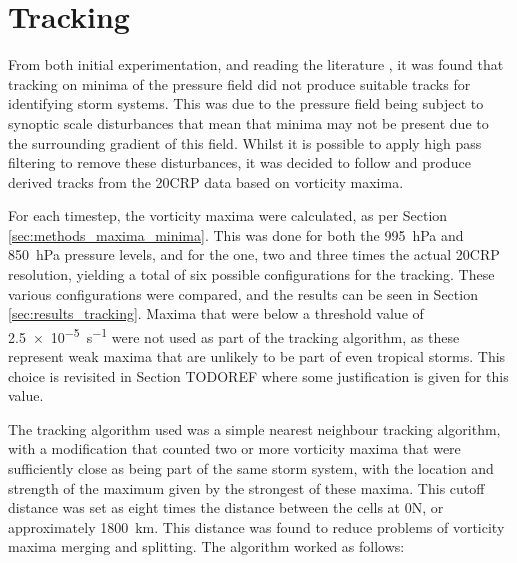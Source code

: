 \documentclass[pdftex,12pt,a4paper]{report}
\begin{document}
\section{Tracking}

From both initial experimentation, and reading the literature \parencite{TODOCITEmultiple}, it was found
that tracking on minima of the pressure field did not produce suitable tracks for identifying
storm systems. This was due to the pressure field being subject to synoptic scale disturbances
that mean that minima may not be present due to the surrounding gradient of this field. Whilst it is
possible to apply high pass filtering to remove these disturbances, it was decided to follow
\textcite{TODOCITEmultiple} and produce derived tracks from the 20CRP data based on vorticity maxima.

For each timestep, the vorticity maxima were calculated, as per Section
\ref{sec:methods_maxima_minima}. This was done for both the \SI{995}{hPa} and \SI{850}{hPa} pressure
levels, and for the one, two and three times the actual 20CRP resolution, yielding a total of six
possible configurations for the tracking. These various configurations were compared, and the
results can be seen in Section \ref{sec:results_tracking}. Maxima that were below a threshold value
of \SI{2.5e-5}{s^{-1}} were not used as part of the tracking algorithm, as these represent weak maxima
that are unlikely to be part of even tropical storms. This choice is revisited in Section TODOREF where
some justification is given for this value.

The tracking algorithm used was a simple nearest neighbour tracking algorithm, with a modification
that counted two or more vorticity maxima that were sufficiently close as being part of the same storm
system, with the location and strength of the maximum given by the strongest of
these maxima. This cutoff distance was set as eight times the distance between the cells at
0\textdegree N, or approximately \SI{1800}{km}. This distance was found to reduce problems of
vorticity maxima merging and splitting. The algorithm worked as follows:
\end{document}
